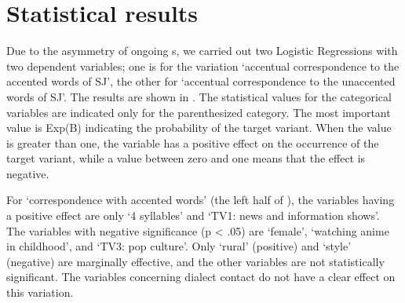 \documentclass[output=paper]{LSP/langsci}
\begin{document}
\section{Statistical results}
Due to the asymmetry of ongoing s, we carried out two Logistic Regressions with two dependent variables; one is for the variation ‘accentual correspondence to the accented words of SJ’, the other for ‘accentual correspondence to the unaccented words of SJ’. The results are shown in . The statistical values for the categorical variables are indicated only for the parenthesized category. The most important value is Exp(B) indicating the probability of the target variant. When the value is greater than one, the variable has a positive effect on the occurrence of the target variant, while a value between zero and one means that the effect is negative.

For ‘correspondence with accented words’ (the left half of ), the variables having a positive effect are only ‘4 syllables’ and ‘TV1: news and information shows’. The variables with negative significance (p {\textless} .05) are ‘female’, ‘watching anime in childhood’, and ‘TV3: pop culture’. Only ‘rural’ (positive) and ‘style’ (negative) are marginally effective, and the other variables are not statistically significant. The variables concerning dialect contact do not have a clear effect on this variation. 
 
\end{document}
